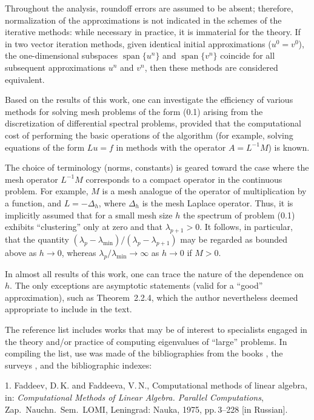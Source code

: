 \documentclass[11pt,oneside]{book}
\newcommand{\myspan}{\operatorname{span}}
\begin{document}
Throughout the analysis, roundoff errors are assumed to be absent; therefore, normalization of the approximations is not indicated in the schemes of the iterative methods: while necessary in practice, it is immaterial for the theory. If in two vector iteration methods, given identical initial approximations ($u^0 = v^0$), the one-dimensional subspaces $\myspan\{u^n\}$ and $\myspan\{v^n\}$ coincide for all subsequent approximations $u^n$ and $v^n$, then these methods are considered equivalent.

Based on the results of this work, one can investigate the efficiency of various methods for solving mesh problems of the form (0.1) arising from the discretization of differential spectral problems, provided that the computational cost of performing the basic operations of the algorithm (for example, solving equations of the form $Lu = f$ in methods with the operator $A = L^{-1}M$) is known.

The choice of terminology (norms, constants) is geared toward the case where the mesh operator $L^{-1}M$ corresponds to a compact operator in the continuous problem. For example, $M$ is a mesh analogue of the operator of multiplication by a function, and $L = -\Delta_h$, where $\Delta_h$ is the mesh Laplace operator. Thus, it is implicitly assumed that for a small mesh size $h$ the spectrum of problem (0.1) exhibits ``clustering'' only at zero and that $\lambda_{p+1} > 0$. It follows, in particular, that the quantity $(\lambda_p - \lambda_{\min}) / (\lambda_p - \lambda_{p+1})$ may be regarded as bounded above as $h \to 0$, whereas $\lambda_p / \lambda_{\min} \to \infty$ as $h \to 0$ if $M > 0$.

In almost all results of this work, one can trace the nature of the dependence on $h$. The only exceptions are asymptotic statements (valid for a ``good'' approximation), such as Theorem~2.2.4, which the author nevertheless deemed appropriate to include in the text.

The reference list includes works that may be of interest to specialists engaged in the theory and/or practice of computing eigenvalues of ``large'' problems. In compiling
the list, use was made of the bibliographies from the books \citep{FaddeevFaddeeva1963,Collatz1968ru,Parlett1983,Weinberger1974,Fichera1978,Chatelin1983,GolubVanLoan1983,CullumWilloughby1985}, the surveys \citep{Ikramov1982,Stewart1976b,KuttlerSigillito1984}, and the bibliographic indexes:

1. Faddeev, D.\,K. and Faddeeva, V.\,N., Computational methods of linear algebra, in: \textit{Computational Methods of Linear Algebra. Parallel Computations}, Zap.\ Nauchn.\ Sem.\ LOMI, Leningrad: Nauka, 1975, pp.\,3--228 [in Russian].
\end{document}
